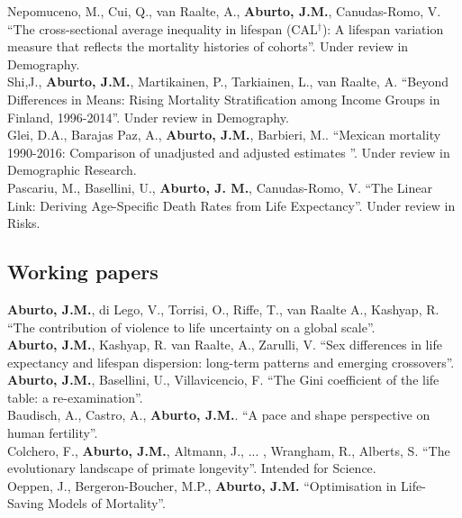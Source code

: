\documentclass[12pt]{article}
\begin{document}
Nepomuceno, M., Cui, Q., van Raalte, A., \textbf{Aburto, J.M.}, Canudas-Romo, V. ``The cross-sectional average inequality in lifespan (CAL$^\dagger$): A lifespan variation measure that reflects the mortality histories of cohorts''. Under review in Demography. \\

Shi,J., \textbf{Aburto, J.M.}, Martikainen, P., Tarkiainen, L., van Raalte, A. ``Beyond Differences in Means: Rising Mortality Stratification among Income Groups in Finland, 1996-2014''. Under review in Demography.\\

Glei, D.A., Barajas Paz, A.,\textbf{ Aburto, J.M.}, Barbieri, M.. ``Mexican mortality 1990-2016: Comparison of unadjusted and adjusted estimates ''. Under review in Demographic Research.\\

Pascariu, M., Basellini, U., \textbf{Aburto, J. M.}, Canudas-Romo, V. ``The Linear Link: Deriving Age-Specific Death Rates from Life Expectancy''. Under review in Risks. 


\subsection*{Working papers}
 \textbf{Aburto, J.M.}, di Lego, V., Torrisi, O., Riffe, T., van Raalte A., Kashyap, R. ``The contribution of violence to life uncertainty on a global scale''.\\

 \textbf{Aburto, J.M.}, Kashyap, R. van Raalte, A., Zarulli, V. ``Sex differences in life expectancy and lifespan dispersion: long-term patterns and emerging crossovers''.\\

\textbf{Aburto, J.M.}, Basellini, U., Villavicencio, F. ``The Gini coefficient of the life table: a re-examination''. \\
 
Baudisch, A., Castro, A., \textbf{Aburto, J.M.}. ``A pace and shape perspective on human fertility''. \\

Colchero, F., \textbf{Aburto, J.M.}, Altmann, J., ... , Wrangham, R., Alberts, S. ``The evolutionary landscape of primate longevity''. Intended for Science.\\  

Oeppen, J., Bergeron-Boucher, M.P., \textbf{Aburto, J.M.} ``Optimisation in Life-Saving Models of Mortality''.\\ 
  
\end{document}
